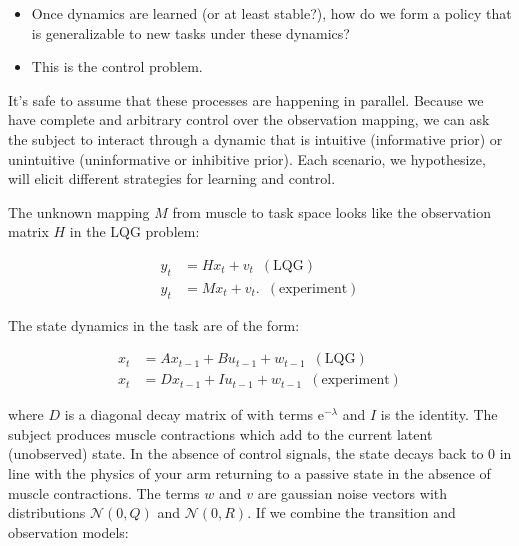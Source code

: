 {\begin{enumerate}
              \begin{itemize}
              \tightlist
              \item
                Once dynamics are learned (or at least stable?), how do
                we form a policy that is generalizable to new tasks
                under these dynamics?
              \item
                This is the control problem.
              \end{itemize}
            \end{enumerate}

            It's safe to assume that these processes are happening in
            parallel. Because we have complete and arbitrary control
            over the observation mapping, we can ask the subject to
            interact through a dynamic that is intuitive (informative
            prior) or unintuitive (uninformative or inhibitive prior).
            Each scenario, we hypothesize, will elicit different
            strategies for learning and control.

            The unknown mapping \(M\) from muscle to task space looks
            like the observation matrix \(H\) in the LQG problem:

            \[
            \begin{align*}
            y_t &= Hx_t + v_t\,\,\,(\mathrm{LQG}) \\
            y_t &= Mx_t + v_t. \,\,\,(\mathrm{experiment})
            \end{align*}
            \]

            The state dynamics in the task are of the form:

            \[
            \begin{align*}
            x_{t} &= Ax_{t-1} + Bu_{t-1} + w_{t-1} \,\,\,(\mathrm{LQG}) \\
            x_t &= Dx_{t-1} + Iu_{t-1} + w_{t-1} \,\,\,(\mathrm{experiment})
            \end{align*}
            \]

            where \(D\) is a diagonal decay matrix of with terms
            \(\mathrm{e}^{-\lambda}\) and \(I\) is the identity. The
            subject produces muscle contractions which add to the
            current latent (unobserved) state. In the absence of control
            signals, the state decays back to \(0\) in line with the
            physics of your arm returning to a passive state in the
            absence of muscle contractions. The terms \(w\) and \(v\)
            are gaussian noise vectors with distributions
            \(\mathcal{N}(0,Q)\) and \(\mathcal{N}(0,R)\). If we combine
            the transition and observation models:

}
